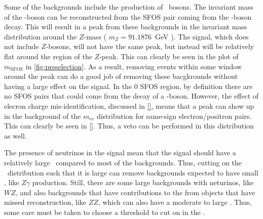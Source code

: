 Some of the backgrounds include the production of \z~bosons.
The invariant mass of the \z-boson can be reconstructed from the SFOS
pair coming from the \z-boson decay. This will result in a peak from these backgrounds
in the invariant mass distribution around the $Z$-mass ( $m_{Z}=91.1876$~GeV \cite{PDG:2014}).
The signal, which does not include $Z$-bosons, will not have the same peak, but instead
will be relatively flat around the region of the $Z$-peak. 
This can clearly be seen in the plot of $m_{\textrm{SFOS}}$ in \fig\ref{fig:preselection}.
As a result, removing events within some window around the peak can do a good job
of removing these bacgkrounds without having a large effect on the signal.
In the 0 SFOS region, by definition there are no SFOS pairs that could come 
from the decay of a \z-boson. However, the effect of elecron charge mis-identification,
discussed in \sec\ref{}, means that a peak can show up in the background
of the $m_{ee}$ distribution for same-sign electron/positron pairs. 
This can clearly be seen in \fig\ref{}.
Thus, a veto can be performed in this distribution as well.

The presence of neutrinos in the signal mean that the signal should have a 
relatively large \MET~compared to most of the backgrounds. Thus, 
cutting on the \MET~distribution such that it is large can remove backgrounds
expected to have small \MET, like $Z\gamma$ production.
Still, there are some large backgrounds with neturinos, like $WZ$, 
and also backgrounds that have contributions to the \MET from objects that have
missed reconstruction, like $ZZ$, which can also have a moderate to large \MET.
Thus, some care must be taken to choose a threshold to cut on in the \MET.

